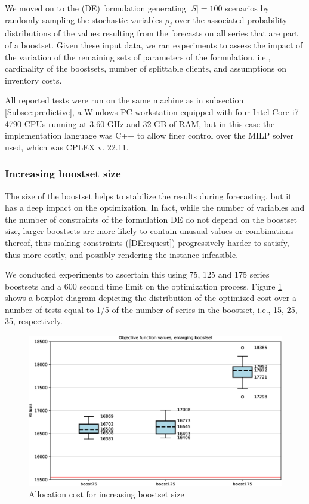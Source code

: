 \documentclass[ijoc,sglanonrev]{informs4}
\begin{document}
We moved on to the (DE) formulation generating $|S|=100$ scenarios by randomly sampling the stochastic variables $\rho_j$ over the associated probability distributions of the values resulting from the forecasts on all series that are part of a boostset. 
Given these input data, we ran experiments to assess the impact of the variation of the remaining sets of parameters of the formulation, i.e., cardinality of the boostsets, number of splittable clients, and assumptions on inventory costs. 

All reported tests were run on the same machine as in subsection \ref{Subsec:predictive}, a Windows PC workstation equipped with four Intel Core i7-4790 CPUs running at 3.60 GHz and 32 GB of RAM, but in this case the implementation language was C++ to allow finer control over the MILP solver used, which was CPLEX v. 22.11.

\subsubsection*{Increasing boostset size}

The size of the boostset helps to stabilize the results during forecasting, but it has a deep impact on the optimization. In fact, while the number of variables and the number of constraints of the formulation DE do not depend on the boostset size, larger boostsets are more likely to contain unusual values or combinations thereof, thus making constraints (\ref{DErequest}) progressively harder to satisfy, thus more costly, and possibly rendering the instance infeasible.

We conducted experiments to ascertain this using 75, 125 and 175 series boostsets and a 600 second time limit on the optimization process. Figure \ref{fig:bsize} shows a boxplot diagram depicting the distribution of the optimized cost over a number of tests equal to 1/5 of the number of series in the boostset, i.e., 15, 25, 35, respectively.

\begin{figure}[ht] 
    \centering
    \includegraphics[width=0.7\linewidth]{figb0.eps}%
    \caption{Allocation cost for increasing boostset size}
    \label{fig:bsize}
\end{figure}
\end{document}
